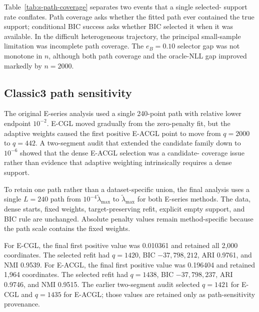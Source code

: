 \documentclass[preprint,12pt,authoryear]{elsarticle}
\begin{document}
Table~\ref{tab:s-path-coverage} separates two events that a single selected-
support rate conflates. Path coverage asks whether the fitted path ever
contained the true support; conditional BIC success asks whether BIC selected
it when it was available. In the difficult heterogeneous trajectory, the
principal small-sample limitation was incomplete path coverage. The
$e_B=0.10$ selector gap was not monotone in $n$, although both path coverage
and the oracle-NLL gap improved markedly by $n=2000$.



\subsection{Classic3 path sensitivity}

The original E-series analysis used a single 240-point path with relative
lower endpoint $10^{-2}$. E-CGL moved gradually from the zero-penalty fit, but
the adaptive weights caused the first positive E-ACGL point to move from
$q=2000$ to $q=442$. A two-segment audit that extended the candidate family
down to $10^{-6}$ showed that the dense E-ACGL selection was a candidate-
coverage issue rather than evidence that adaptive weighting intrinsically
requires a dense support.

To retain one path rather than a dataset-specific union, the final analysis
uses a single $L=240$ path from $10^{-4}\widetilde\lambda_{\max}$ to
$\widetilde\lambda_{\max}$ for both E-series methods. The data, dense starts,
fixed weights, target-preserving refit, explicit empty support, and BIC rule
are unchanged. Absolute penalty values remain method-specific because the
path scale contains the fixed weights.

For E-CGL, the final first positive value was 0.010361 and retained all 2,000
coordinates. The selected refit had $q=1420$, BIC $-37{,}798{,}212$, ARI
0.9761, and NMI 0.9539. For E-ACGL, the final first positive value was 0.196404
and retained 1,964 coordinates. The selected refit had $q=1438$, BIC
$-37{,}798{,}237$, ARI 0.9746, and NMI 0.9515. The earlier two-segment audit
selected $q=1421$ for E-CGL and $q=1435$ for E-ACGL; those values are retained
only as path-sensitivity provenance.
\end{document}
